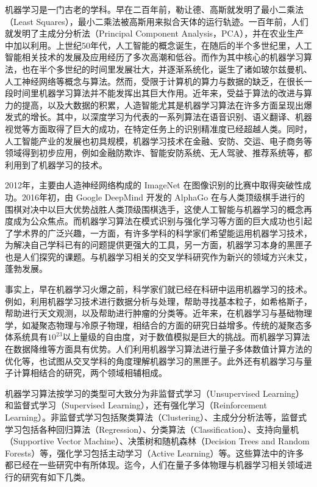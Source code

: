 机器学习是一门古老的学科。早在二百年前，勒让德、高斯就发明了最小二乘法（Least Squares），最小二乘法被高斯用来拟合天体的运行轨迹。一百年前，人们就发明了主成分分析法（Principal Component Analysis，PCA）\cite{pearson1901,hotelling1933}，并在农业生产中加以利用\cite{pcabook}。上世纪50年代，人工智能的概念诞生，在随后的半个多世纪里，人工智能相关技术的发展及应用经历了多次高潮和低谷。而作为其中核心的机器学习算法，也在半个多世纪的时间里发展壮大，并逐渐系统化，诞生了诸如玻尔兹曼机、人工神经网络等概念与算法。然而，受限于计算机的算力与数据的缺乏，在很长一段时间里机器学习算法并不能发挥出其巨大作用。近年来，受益于算法的改进与算力的提高，以及大数据的积累，人造智能尤其是机器学习算法在许多方面呈现出爆发式的增长。其中，以深度学习\cite{dl2015}为代表的一系列算法在语音识别、语义翻译、机器视觉等方面取得了巨大的成功，在特定任务上的识别精准度已经超越人类。同时，人工智能产业的发展也初具规模，机器学习技术在金融、安防、交运、电子商务等领域得到初步应用，例如金融防欺诈、智能安防系统、无人驾驶、推荐系统等，都利用到了机器学习的技术。


2012年，主要由人造神经网络构成的 ImageNet 在图像识别的比赛中取得突破性成功\cite{imagenet2012}。2016年初，由 Google DeepMind 开发的 AlphaGo 在与人类顶级棋手进行的围棋对决中以巨大优势战胜人类顶级围棋选手，这使人工智能与机器学习的概念再度成为公众焦点。而机器学习算法在模式识别与强化学习等方面的巨大成功也引起了学术界的广泛兴趣，一方面，有许多学科的科学家们希望能运用机器学习技术，为解决自己学科已有的问题提供更强大的工具，另一方面，机器学习本身的黑匣子也是人们探究的课题。与机器学习相关的交叉学科研究作为新兴的领域方兴未艾，蓬勃发展\cite{mlrev1903}。

事实上，早在机器学习火爆之前，科学家们就已经在科研中运用机器学习的技术。例如，利用机器学习技术进行数据分析与处理，帮助寻找基本粒子，如希格斯子，帮助进行天文观测，以及帮助进行肿瘤的分类等。近年来，在机器学习与基础物理学，如凝聚态物理与冷原子物理，相结合的方面的研究日益增多。传统的凝聚态多体系统具有$10^{23}$以上量级的自由度，对于数值模拟是巨大的挑战。而机器学习算法在数据降维等方面具有优势。人们利用机器学习算法进行量子多体数值计算方法的优化等，也试图从交叉学科的角度理解机器学习的黑匣子。此外还有机器学习与量子计算相结合的研究\cite{qml2017,qai2017}，两个领域相辅相成。

机器学习算法按学习的类型可大致分为\cite{prmlbook}非监督式学习（Unsupervised Learning）和监督式学习（Supervised Learning），还有强化学习（Reinforcement Learning）。非监督式学习包括聚类算法（Clustering）、主成分分析法等，监督式学习包括各种回归算法（Regression）、分类算法（Classification）、支持向量机（Supportive Vector Machine）、决策树和随机森林（Decision Trees and Random Forests）等，强化学习包括主动学习（Active Learning）等。这些算法中的许多都已经在一些研究中有所体现。迄今，人们在量子多体物理与机器学习相关领域进行的研究有如下几类。

